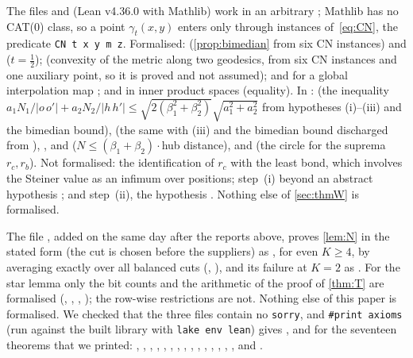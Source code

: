 \documentclass[10pt]{amsart}
\theoremstyle{plain}
\theoremstyle{definition}
\theoremstyle{remark}
\numberwithin{equation}{section}
\newcommand{\dd}[2]{|#1\,#2|}
\begin{document}
The files  and 
(Lean v4.36.0 with Mathlib)
work in an arbitrary ; Mathlib has no CAT(0) class, so a point $\gamma_t(x,y)$ enters only
through instances of~\eqref{eq:CN}, the predicate \texttt{CN t x y m z}. Formalised:
 (\cref{prop:bimedian} from six CN instances) and
 ($t=\tfrac12$);  (convexity of the metric along two geodesics, from six CN
instances and one auxiliary point, so it is proved and not assumed);  and
 for a global interpolation map ; and in inner product spaces
 (equality). In :  (the inequality
$a_1N_1/\dd o{o'}+a_2N_2/\dd h{h'}\le\sqrt{2(\beta_1^2+\beta_2^2)}\sqrt{a_1^2+a_2^2}$ from hypotheses (i)--(iii) and the
bimedian bound),  (the same with (iii) and the bimedian bound discharged from ),
,  and  ($N\le(\beta_1+\beta_2)\cdot$hub distance),
 and  (the circle for the suprema $r_c,r_b$). Not formalised: the
identification of $r_c$ with the least bond, which involves the Steiner value as an infimum over positions;
step~(i) beyond an abstract hypothesis ; and step~(ii), the hypothesis . Nothing else
of \cref{sec:thmW} is formalised.

The file , added on the same day after the reports above, proves
\cref{lem:N} in the stated form (the cut is chosen before the suppliers) as , for even $K\ge4$,
by averaging exactly over all balanced cuts (, ), and its failure at $K=2$
as . For the star lemma only the bit counts and the arithmetic of the proof of
\cref{thm:T} are formalised (, ,
, ); the row-wise restrictions are not. Nothing else of this
paper is formalised. We checked that the three files contain no \texttt{sorry}, and
\texttt{\#print axioms} (run against the built library with \texttt{lake env lean}) gives ,
 and  for the seventeen theorems
that we printed: , , , ,
, , , , ,
, , , , , ,
 and .
\end{document}
